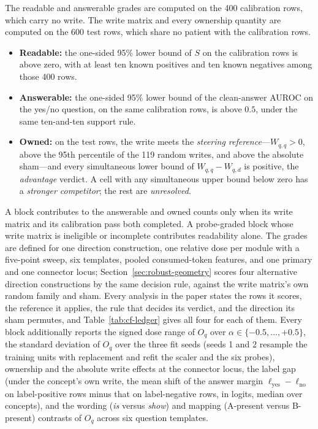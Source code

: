 The readable and answerable grades are computed on the 400 calibration rows, which carry no write. The write matrix and every ownership quantity are computed on the 600 test rows, which share no patient with the calibration rows.
\begin{itemize}[leftmargin=*,itemsep=1pt,topsep=2pt]
\item \textbf{Readable:} the one-sided 95\% lower bound of $S$ on the calibration rows is above zero, with at least ten known positives and ten known negatives among those 400 rows.
\item \textbf{Answerable:} the one-sided 95\% lower bound of the clean-answer AUROC on the yes/no question, on the same calibration rows, is above $0.5$, under the same ten-and-ten support rule.
\item \textbf{Owned:} on the test rows, the write meets the \emph{steering reference}---$W_{q,q}>0$, above the 95th percentile of the 119 random writes, and above the absolute sham---and every simultaneous lower bound of $W_{q,q}-W_{q,d}$ is positive, the \emph{advantage} verdict. A cell with any simultaneous upper bound below zero has a \emph{stronger competitor}; the rest are \emph{unresolved}.
\end{itemize}
A block contributes to the answerable and owned counts only when its write matrix and its calibration pass both completed. A probe-graded block whose write matrix is ineligible or incomplete contributes readability alone.
The grades are defined for one direction construction, one relative dose per module with a five-point sweep, six templates, pooled consumed-token features, and one primary and one connector locus; Section~\ref{sec:robust-geometry} scores four alternative direction constructions by the same decision rule, against the write matrix's own random family and sham. Every analysis in the paper states the rows it scores, the reference it applies, the rule that decides its verdict, and the direction its sham permutes, and Table~\ref{tab:cf-ledger} gives all four for each of them.
Every block additionally reports the signed dose range of $O_q$ over $\alpha\in\{-0.5,\ldots,+0.5\}$, the standard deviation of $O_q$ over the three fit seeds (seeds 1 and 2 resample the training units with replacement and refit the scaler and the six probes), ownership and the absolute write effects at the connector locus, the label gap (under the concept's own write, the mean shift of the answer margin $\ell_{\mathrm{yes}}-\ell_{\mathrm{no}}$ on label-positive rows minus that on label-negative rows, in logits, median over concepts), and the wording (\emph{is} versus \emph{show}) and mapping (A-present versus B-present) contrasts of $O_q$ across six question templates.

